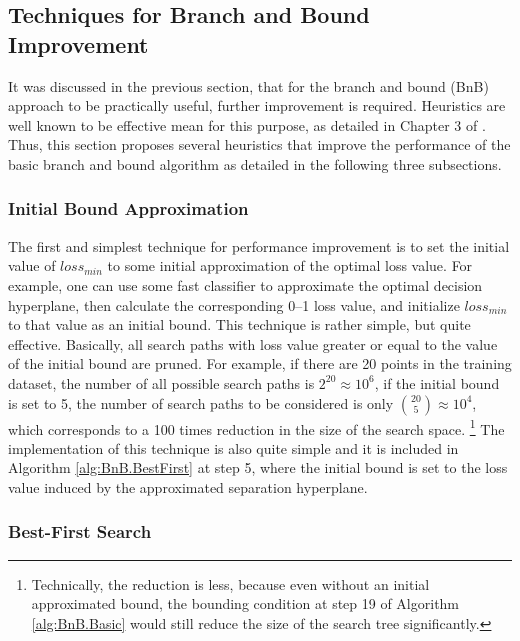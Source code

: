 \subsection{Techniques for Branch and Bound Improvement}
\label{sec:bnb.improvement}

It was discussed in the previous section, that for the branch and bound (BnB) approach to be practically useful, further improvement is required. Heuristics are well known to be effective mean for this purpose, as detailed in Chapter 3 of \cite{russell}. Thus, this section proposes several heuristics that improve the performance of the basic branch and bound algorithm as detailed in the following three subsections.


\subsubsection{Initial Bound Approximation}
\label{sec:bnb.ordering}

The first and simplest technique for performance improvement is to set the initial value of $loss_{min}$ to some initial approximation of the optimal loss value. For example, one can use some fast classifier to approximate the optimal decision hyperplane, then calculate the corresponding 0--1 loss value, and initialize $loss_{min}$ to that value as an initial bound. This technique is rather simple, but quite effective. Basically, all search paths with loss value greater or equal to the value of the initial bound are pruned. For example, if there are 20 points in the training dataset, the number of all possible search paths is $2^{20} \approx 10^6$, if the initial bound is set to 5, the number of search paths to be considered is only ${20 \choose 5} \approx 10^4$, which corresponds to a 100 times reduction in the size of the search space. \footnote{Technically, the reduction is less, because even without an initial approximated bound, the bounding condition at step 19 of Algorithm \ref{alg:BnB.Basic} would still reduce the size of the search tree significantly.} The implementation of this technique is also quite simple and it is included in Algorithm \ref{alg:BnB.BestFirst} at step 5, where the initial bound is set to the loss value induced by the approximated separation hyperplane.    

\subsubsection{Best-First Search}
\label{sec:bnb.ordering}

